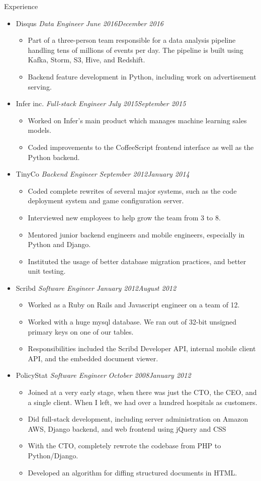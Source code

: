 \documentclass[11pt,oneside]{article}
\newenvironment{ressection}[1]{
    \textrm{\Large#1}
    \begin{itemize}
}{
    \end{itemize}
}
\newcommand{\ressubitem}[1]{
    \item \begin{flushleft} \textsf{#1} \end{flushleft}
}
\newcommand{\resbigitem}[3]{
    \item
    \textrm{#1}
    \hspace{5pt}
    \textit{#2}
    \hfill
    \textit{#3}
}
\newenvironment{ressubsec}[3]{
    \resbigitem{#1}{#2}{#3}
    \begin{itemize}
}{
    \end{itemize}
}
\begin{document}
\begin{ressection}{Experience}

    \begin{ressubsec}{Disqus}{Data Engineer}{June 2016\textendash December 2016}
        \ressubitem{Part of a three-person team responsible for a data analysis pipeline handling tens of millions of events per day. The pipeline is built using Kafka, Storm, S3, Hive, and Redshift.}
        \ressubitem{Backend feature development in Python, including work on advertisement serving.}
    \end{ressubsec}

    \begin{ressubsec}{Infer inc.}{Full-stack Engineer}{July 2015\textendash September 2015}
        \ressubitem{Worked on Infer's main product which manages machine learning sales models.}
        \ressubitem{Coded improvements to the CoffeeScript frontend interface as well as the Python backend.}
    \end{ressubsec}

    \begin{ressubsec}{TinyCo}{Backend Engineer}{September 2012\textendash January 2014}
        \ressubitem{Coded complete rewrites of several major systems, such as the code deployment system and game configuration server.}
        \ressubitem{Interviewed new employees to help grow the team from 3 to 8.}
        \ressubitem{Mentored junior backend engineers and mobile engineers, especially in Python and Django.}
        \ressubitem{Instituted the usage of better database migration practices, and better unit testing.}
    \end{ressubsec}

    \begin{ressubsec}{Scribd}{Software Engineer}{January 2012\textendash August 2012}
        \ressubitem{Worked as a Ruby on Rails and Javascript engineer on a team of 12.}
        \ressubitem{Worked with a huge mysql database. We ran out of 32-bit unsigned primary keys on one of our tables.}
        \ressubitem{Responsibilities included the Scribd Developer API, internal mobile client API, and the embedded document viewer.}
    \end{ressubsec}

    \begin{ressubsec}{PolicyStat}{Software Engineer}{October 2008\textendash January 2012}
        \ressubitem{Joined at a very early stage, when there was just the CTO, the CEO, and a single client. When I left, we had over a hundred hospitals as customers.}
        \ressubitem{Did full-stack development, including server administration on Amazon AWS, Django backend, and web frontend using jQuery and CSS}
        \ressubitem{With the CTO, completely rewrote the codebase from PHP to Python/Django.}
        \ressubitem{Developed an algorithm for diffing structured documents in HTML.}
    \end{ressubsec}

\end{ressection}
\end{document}
